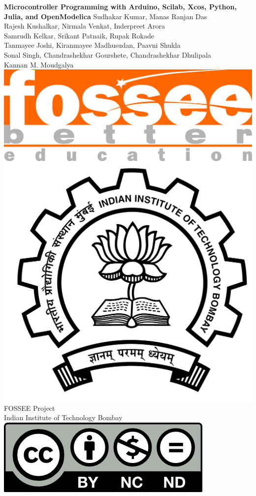 \begin{center}
    {\bf {\Huge Microcontroller Programming with Arduino, Scilab, Xcos,
            Python, Julia, and OpenModelica}}
    \vfill
    Sudhakar Kumar, Manas Ranjan Das \\
    Rajesh Kushalkar, Nirmala Venkat, Inderpreet Arora \\
    Samrudh Kelkar, Srikant Patnaik, Rupak Rokade \\
    Tanmayee Joshi, Kiranmayee Madhusudan, Paavni Shukla \\
    Sonal Singh, Chandrashekhar Gourshete, Chandrashekhar Dhulipala \\
    Kannan M. Moudgalya \\
    \vfill
    \includegraphics[width=0.3\linewidth]{suppl/fossee_logo_hi.png} \quad
    \includegraphics[width=0.2\linewidth]{suppl/IITB-logo-HighRes.png} \\
    FOSSEE Project \\
    Indian Institute of Technology Bombay \\ [2mm]
    \includegraphics[width=0.15\linewidth]{suppl/by-nc-nd.png}
\end{center}

\clearpage
